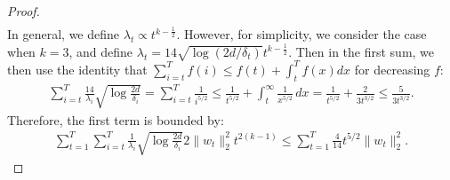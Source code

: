 \begin{proof}
\begin{align*}
\end{align*}
In general, we define $\lambda_t\propto t^{k-\frac{1}{2}}$. However, for simplicity, we consider the case when $k=3$, and define $\lambda_t = 14\sqrt{\log(2d/\delta_t)}t^{k-\frac{1}{2}}$. Then in the first sum, we then use the identity that $\sum_{i=t}^T f(i) \leq f(t)+\int_t^T f(x) dx$ for decreasing $f$:
\begin{align*}
    \sum_{i=t}^T \frac{14}{\lambda_i}\sqrt{\log \frac{2d}{\delta_i}}
    = \sum_{i=t}^T \frac{1}{i^{5/2}} \leq \frac{1}{t^{5/2}} + \int_t^\infty \frac{1}{x^{5/2}}\, dx = \frac{1}{t^{5/2}} + \frac{2}{3t^{3/2}} \leq \frac{5}{3t^{3/2}}.
\end{align*}
Therefore, the first term is bounded by:
\begin{align*}
    \sum_{t=1}^T\sum_{i=t}^T \frac{1}{\lambda_i}\sqrt{\log \frac{2d}{\delta_i}} 2\|w_t\|_2^2t^{2(k-1)}
    \leq \sum_{t=1}^T \frac{4}{14}t^{5/2}\|w_t\|_2^2.
\end{align*}

\end{proof}
